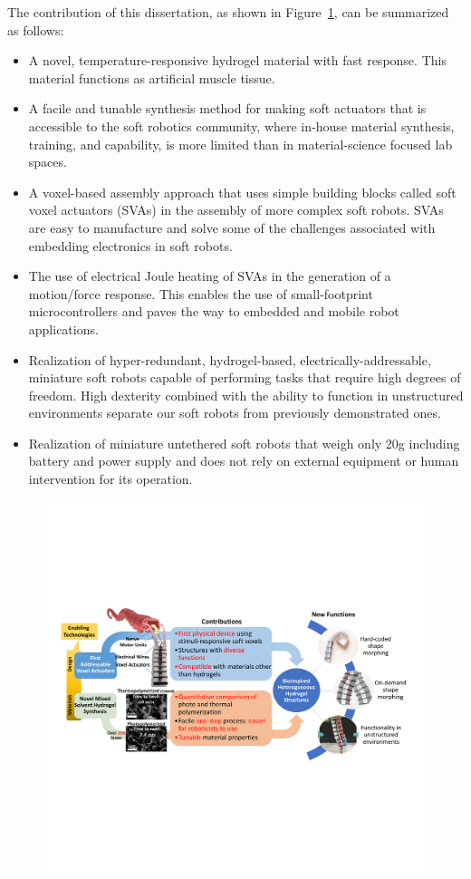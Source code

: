 The contribution of this dissertation, as shown in Figure~\ref{fig:summary}, can be summarized as follows:

\begin{itemize}
	\item A novel, temperature-responsive hydrogel material with fast response. This material functions as artificial muscle tissue. 
	\item A facile and tunable synthesis method for making soft actuators that is accessible to the soft robotics community, where in-house material synthesis, training, and capability, is more limited than in material-science focused lab spaces.
	\item A voxel-based assembly approach that uses simple building blocks called soft voxel actuators (SVAs) in the assembly of more complex soft robots. SVAs are easy to manufacture and solve some of the challenges associated with embedding electronics in soft robots.
	\item The use of electrical Joule heating of SVAs in the generation of a motion/force response. This enables the use of small-footprint microcontrollers and paves the way to embedded and mobile robot applications.
	\item Realization of hyper-redundant, hydrogel-based, electrically-addressable, miniature soft robots capable of performing tasks that require high degrees of freedom. High dexterity combined with the ability to function in unstructured environments separate our soft robots from previously demonstrated ones.
	\item Realization of miniature untethered soft robots that weigh only 20g including battery and power supply and does not rely on external equipment or human intervention for its operation.
\end{itemize}
\begin{figure}[!ht]
      \centering
      \includegraphics[width=\textwidth]{summary.pdf}
      \caption[]{}
      \label{fig:summary}
\end{figure}
